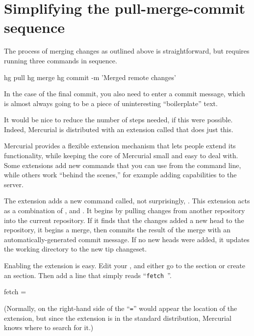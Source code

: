 \section{Simplifying the pull-merge-commit sequence}
\label{sec:tour-merge:fetch}

The process of merging changes as outlined above is straightforward,
but requires running three commands in sequence.
\begin{codesample2}
  hg pull
  hg merge
  hg commit -m 'Merged remote changes'
\end{codesample2}
In the case of the final commit, you also need to enter a commit
message, which is almost always going to be a piece of uninteresting
``boilerplate'' text.

It would be nice to reduce the number of steps needed, if this were
possible.  Indeed, Mercurial is distributed with an extension called
 that does just this.

Mercurial provides a flexible extension mechanism that lets people
extend its functionality, while keeping the core of Mercurial small
and easy to deal with.  Some extensions add new commands that you can
use from the command line, while others work ``behind the scenes,''
for example adding capabilities to the server.

The  extension adds a new command called, not
surprisingly, .  This extension acts as a combination of
,  and .  It begins by pulling
changes from another repository into the current repository.  If it
finds that the changes added a new head to the repository, it begins a
merge, then commits the result of the merge with an
automatically-generated commit message.  If no new heads were added,
it updates the working directory to the new tip changeset.

Enabling the  extension is easy.  Edit your
, and either go to the  section
or create an  section.  Then add a line that
simply reads ``\Verb+fetch +''.
\begin{codesample2}
  [extensions]
  fetch =
\end{codesample2}
(Normally, on the right-hand side of the ``\texttt{=}'' would appear
the location of the extension, but since the  extension
is in the standard distribution, Mercurial knows where to search for
it.)

